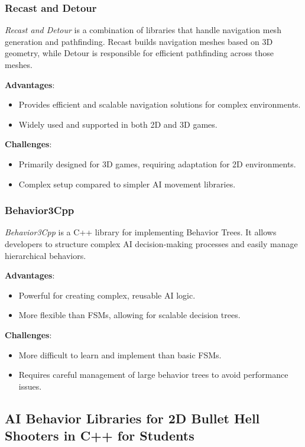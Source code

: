 \subsubsection{Recast and Detour}

\textit{Recast and Detour} is a combination of libraries that handle navigation mesh generation and pathfinding. Recast builds navigation meshes based on 3D geometry, while Detour is responsible for efficient pathfinding across those meshes.

\textbf{Advantages}:
\begin{itemize}
    \item Provides efficient and scalable navigation solutions for complex environments.
    \item Widely used and supported in both 2D and 3D games.
\end{itemize}

\textbf{Challenges}:
\begin{itemize}
    \item Primarily designed for 3D games, requiring adaptation for 2D environments.
    \item Complex setup compared to simpler AI movement libraries.
\end{itemize}

\subsubsection{Behavior3Cpp}

\textit{Behavior3Cpp} is a C++ library for implementing Behavior Trees. It allows developers to structure complex AI decision-making processes and easily manage hierarchical behaviors.

\textbf{Advantages}:
\begin{itemize}
    \item Powerful for creating complex, reusable AI logic.
    \item More flexible than FSMs, allowing for scalable decision trees.
\end{itemize}

\textbf{Challenges}:
\begin{itemize}
    \item More difficult to learn and implement than basic FSMs.
    \item Requires careful management of large behavior trees to avoid performance issues.
\end{itemize}

\subsection{AI Behavior Libraries for 2D Bullet Hell Shooters in C++ for Students}

